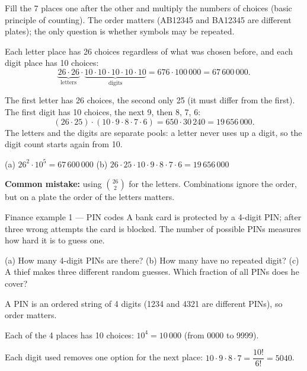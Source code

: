 \ifsolutions
	\soltitle
	\idea Fill the 7 places one after the other and multiply the numbers of
	choices (basic principle of counting). The order matters (AB12345 and
	BA12345 are different plates); the only question is whether symbols may be
	repeated.

	 Each letter place has 26 choices regardless of
	what was chosen before, and each digit place has 10 choices:
	\[ \underbrace{26\cdot26}_{\text{letters}}\cdot
		\underbrace{10\cdot10\cdot10\cdot10\cdot10}_{\text{digits}}
		= 676\cdot100\,000 = 67\,600\,000. \]

	 The first letter has 26 choices, the second only
	25 (it must differ from the first). The first digit has 10 choices, the next
	9, then 8, 7, 6:
	\[ (26\cdot25)\cdot(10\cdot9\cdot8\cdot7\cdot6) = 650\cdot30\,240
		= 19\,656\,000. \]
	The letters and the digits are separate pools: a letter never uses up a
	digit, so the digit count starts again from 10.

	\begin{answer}
		(a) $26^2\cdot10^5 = 67\,600\,000$ \qquad
		(b) $26\cdot25\cdot10\cdot9\cdot8\cdot7\cdot6 = 19\,656\,000$
	\end{answer}

	\begin{remark}
		\textbf{Common mistake:} using $\binom{26}{2}$ for the letters. Combinations
		ignore the order, but on a plate the order of the letters matters.
	\end{remark}
\fi

\begin{fin}{Finance example 1 --- PIN codes}
	\context A bank card is protected by a 4-digit PIN; after three wrong
	attempts the card is blocked. The number of possible PINs measures how hard
	it is to guess one.

	(a) How many 4-digit PINs are there? (b) How many have no repeated digit?
	(c) A thief makes three different random guesses. Which fraction of all
	PINs does he cover?
\end{fin}
\workspace{2.5cm}

\ifsolutions
	\soltitle
	\idea A PIN is an ordered string of 4 digits (1234 and 4321 are different
	PINs), so order matters.

	 Each of the 4 places has 10 choices: $10^4=10\,000$ (from 0000 to
	9999).

	 Each digit used removes one option for the next place:
	$10\cdot9\cdot8\cdot7=\dfrac{10!}{6!}=5040$.

